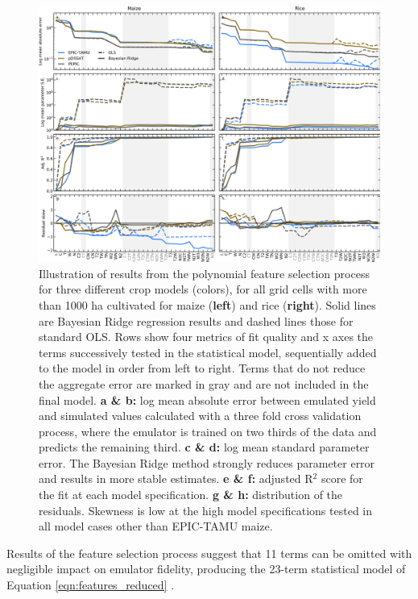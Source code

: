 \documentclass[gmdd]{copernicus} %
\providecommand{\DIFadd}[1]{{\protect\color{blue}\uwave{#1}}} %
\providecommand{\DIFaddbegin}{} %
\providecommand{\DIFaddend}{} %
\begin{document}
\begin{figure}[ht]
\centering
   \includegraphics[width=15cm]{figures/model_select_maize_rice.png}
    \caption{
    Illustration of results from the polynomial feature selection process for three different crop models (colors), for all grid cells with more than 1000 ha cultivated for maize (\textbf{left}) and rice (\textbf{right}). 
    Solid lines are Bayesian Ridge regression results and dashed lines those for standard OLS. Rows show four metrics of fit quality and x axes the terms successively tested in the statistical model, sequentially added to the model in order from left to right.
    Terms that do not reduce the aggregate error are marked in {\color{dark-gray} gray} and are not included in the final model. 
    \textbf{a \& b:} log mean absolute error between emulated yield and simulated values calculated with a three fold cross validation process, where the emulator is trained on two thirds of the data and predicts the remaining third.
    \textbf{c \& d:} log mean standard parameter error. The Bayesian Ridge method strongly reduces parameter error and results in more stable estimates. 
    \textbf{e \& f:} adjusted R$^2$ score for the fit at each model specification. 
    \textbf{g \& h:} distribution of the residuals. Skewness is low at the high model specifications tested in all model cases other than EPIC-TAMU maize.
    }
   \label{fig:features}
\end{figure}

Results of the feature selection process suggest that 11 terms can be omitted with negligible impact on emulator fidelity, producing the 23-term statistical model of Equation \ref{eqn:features_reduced} \DIFaddbegin \DIFadd{(with removed terms shown in  }{\color{dark-gray} \DIFadd{gray}}\DIFadd{)}\DIFaddend .
\end{document}
